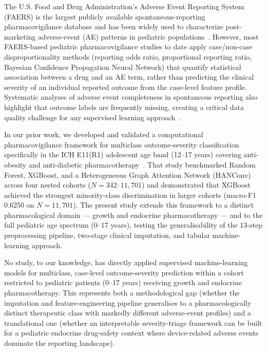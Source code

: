 \documentclass[10pt,twocolumn]{article}
\newcommand{\FAERS}{\textsf{FAERS}\xspace}
\begin{document}
The U.S. Food and Drug Administration's Adverse Event Reporting System (\FAERS) is the largest publicly available spontaneous-reporting pharmacovigilance database and has been widely used to characterize post-marketing adverse-event (AE) patterns in pediatric populations~\cite{misu2023, chen2022}. However, most \FAERS-based pediatric pharmacovigilance studies to date apply case/non-case disproportionality methods (reporting odds ratio, proportional reporting ratio, Bayesian Confidence Propagation Neural Network) that quantify statistical association between a drug and an AE term, rather than predicting the clinical severity of an individual reported outcome from the case-level feature profile. Systematic analyses of adverse event completeness in spontaneous reporting also highlight that outcome labels are frequently missing, creating a critical data quality challenge for any supervised learning approach~\cite{misu2023}.
 
In our prior work, we developed and validated a computational pharmacovigilance framework for multiclass outcome-severity classification specifically in the ICH E11(R1) adolescent age band (12--17 years) covering anti-obesity and anti-diabetic pharmacotherapy~\cite{telkar2026obesity}. That study benchmarked Random Forest, XGBoost, and a Heterogeneous Graph Attention Network (HANConv) across four nested cohorts ($N = 342$--$11{,}701$) and demonstrated that XGBoost achieved the strongest minority-class discrimination in larger cohorts (macro-F1 0.6250 on $N = 11{,}701$). The present study extends this framework to a distinct pharmacological domain --- growth and endocrine pharmacotherapy --- and to the full pediatric age spectrum (0--17 years), testing the generalisability of the 13-step preprocessing pipeline, two-stage clinical imputation, and tabular machine-learning approach.
 
No study, to our knowledge, has directly applied supervised machine-learning models for multiclass, case-level outcome-severity prediction within a cohort restricted to pediatric patients (0--17 years) receiving growth and endocrine pharmacotherapy. This represents both a methodological gap (whether the imputation and feature-engineering pipeline generalises to a pharmacologically distinct therapeutic class with markedly different adverse-event profiles) and a translational one (whether an interpretable severity-triage framework can be built for a pediatric endocrine drug-safety context where device-related adverse events dominate the reporting landscape).
 
\end{document}
